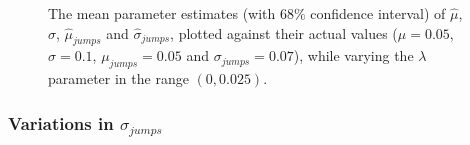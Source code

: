 \documentclass[11pt,oneside,openany,a4paper,english, report, goldenblock
]{usthesis}
\begin{document}
\begin{figure}[h]
{\begin{subfloatrow}
	\end{subfloatrow}}{
		\caption{The mean parameter estimates (with $68\%$ confidence interval) of $\hat{\mu}$, $\hat{\sigma}$, $\hat{\mu}_{jumps}$ and $\hat{\sigma}_{jumps}$, plotted against their actual values ($\mu = 0.05$, $\sigma = 0.1$, $\mu_{jumps} = 0.05$ and $\sigma_{jumps} = 0.07$), while varying the $\lambda$ parameter in the range $\left(0, 0.025\right)$.}
		\label{fig:sensitivity_test:multiple_output:varying_lambda}}
\end{figure}


\subsubsection{Variations in $\sigma_{jumps}$}

\end{document}
